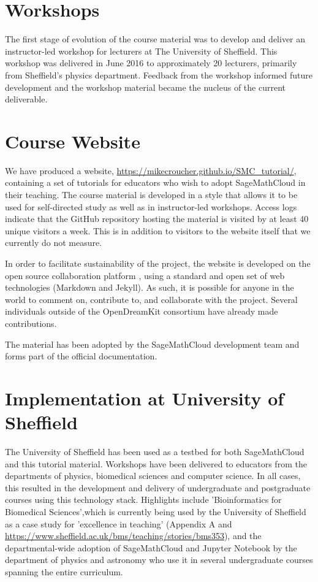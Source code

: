 \documentclass{deliverablereport}
\author{Mike Croucher and Tania Allard}
\begin{document}
\maketitle
\strut\githubissuedescription
\tableofcontents\newpage
\section{Workshops}
The first stage of evolution of the course material was to develop and deliver an instructor-led workshop for lecturers at The University of Sheffield.
This workshop was delivered in June 2016 to approximately 20 lecturers, primarily from Sheffield's physics department. Feedback from the workshop informed future development and the workshop material became the nucleus of the current deliverable.
\section{Course Website}
We have produced a website, \url{https://mikecroucher.github.io/SMC_tutorial/}, containing a set of tutorials for educators who wish to adopt SageMathCloud in their teaching. The course material is developed in a style that allows it to be used for self-directed study as well as in instructor-led workshops.
Access logs indicate that the GitHub repository hosting the material is visited by at least 40 unique visitors a week. This is in addition to visitors to the website itself that we currently do not measure.

In order to facilitate sustainability of the project, the website is
developed on the open source collaboration platform \GitHub, using a standard and open set of web technologies (Markdown and Jekyll). As such, it is possible for anyone in the world to comment on, contribute to, and collaborate with the project.
Several individuals outside of the OpenDreamKit consortium have already made contributions.

The material has been adopted by the SageMathCloud development team and forms part of the official documentation.
\section{Implementation at University of Sheffield}
The University of Sheffield has been used as a testbed for both SageMathCloud and this tutorial material. Workshops have been delivered to educators from the departments of physics, biomedical sciences and computer science. In all cases, this resulted in the development and delivery of undergraduate and postgraduate courses using this technology stack. Highlights include 'Bioinformatics for Biomedical Sciences',which is currently being used by the University of Sheffield as a case study for 'excellence in teaching' (Appendix A and \url{https://www.sheffield.ac.uk/bms/teaching/stories/bms353}), and the departmental-wide adoption of SageMathCloud and Jupyter Notebook by the department of physics and astronomy who use it in several undergraduate courses spanning the entire curriculum.
\end{document}
